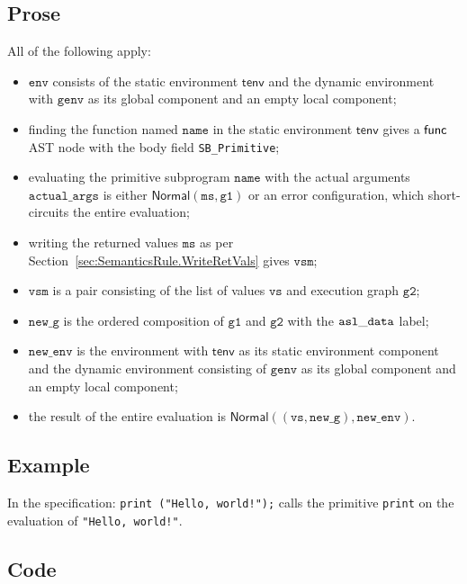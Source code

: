 \documentclass{book}
\newcommand\secref[1]{Section~\ref{sec:#1}}
\newcommand\tenv[0]{\textsf{tenv}}
\newcommand\ProseOrError[0]{or an error configuration, which short-circuits the entire evaluation}
\newcommand\Normal[0]{\textsf{Normal}}
\newcommand\newenv[0]{\texttt{new\_env}}
\newcommand\env[0]{\texttt{env}}
\newcommand\newg[0]{\texttt{new\_g}}
\newcommand\vvs[0]{\texttt{vs}}
\newcommand\vms[0]{\texttt{ms}}
\newcommand\vgone[0]{\texttt{g1}}
\newcommand\vgtwo[0]{\texttt{g2}}
\newcommand\name[0]{\texttt{name}}
\newcommand\actualargs[0]{\texttt{actual\_args}}
\newcommand\genv[0]{\texttt{genv}}
\newcommand\vvsm[0]{\texttt{vsm}}
\begin{document}
  \subsection{Prose}
  All of the following apply:
  \begin{itemize}
  \item $\env$ consists of the static environment $\tenv$ and the dynamic environment with $\genv$ as its
  global component and an empty local component;
  \item finding the function named $\name$ in the static environment $\tenv$ gives a $\textsf{func}$ AST node
  with the body field \texttt{SB\_Primitive};
  \item evaluating the primitive subprogram $\name$ with the actual arguments $\actualargs$
  is either $\Normal(\vms, \vgone)$ \ProseOrError;
  \item writing the returned values $\vms$ as per \secref{SemanticsRule.WriteRetVals} gives $\vvsm$;
  \item $\vvsm$ is a pair consisting of the list of values $\vvs$ and execution graph $\vgtwo$;
  \item $\newg$ is the ordered composition of $\vgone$ and $\vgtwo$ with the $\mathtt{asl\_data}$ label;
  \item $\newenv$ is the environment with $\tenv$ as its static environment component
  and the dynamic environment consisting of $\genv$ as its global component and an empty local component;
  \item the result of the entire evaluation is $\Normal((\vvs, \newg), \newenv)$.
  \end{itemize}

  \subsection{Example}
  In the specification:
  \texttt{print ("Hello, world!");} calls the primitive \texttt{print} on the evaluation of \texttt{"Hello, world!"}.

  \subsection{Code}
\end{document}
